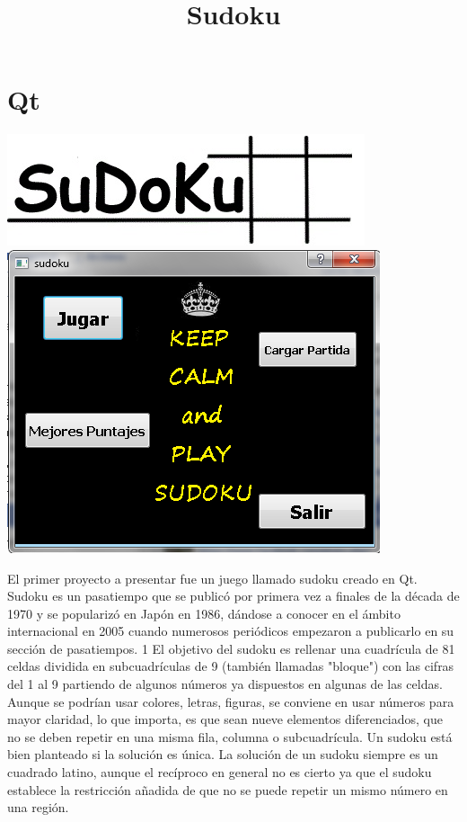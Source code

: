 \documentclass[12pt]{extbook}
\begin{document}
\chapter{Qt}
\begin{center}
\title{\Large{Sudoku}}\maketitle
\end{center}
\begin{center}
\includegraphics[width=.70\textwidth]{suini.jpg}
\includegraphics[width=.70\textwidth]{inicio.png}
\end{center}
El primer proyecto a presentar fue un juego llamado sudoku creado en Qt.
Sudoku es un pasatiempo que se publicó por primera vez a finales de la década de 1970 y se popularizó en Japón en 1986, dándose a conocer en el ámbito internacional en 2005 cuando numerosos periódicos empezaron a publicarlo en su sección de pasatiempos. 1 El objetivo del sudoku es rellenar una cuadrícula de 81 celdas  dividida en subcuadrículas de 9 (también llamadas "bloque") con las cifras del 1 al 9 partiendo de algunos números ya dispuestos en algunas de las celdas. Aunque se podrían usar colores, letras, figuras, se conviene en usar números para mayor claridad, lo que importa, es que sean nueve elementos diferenciados, que no se deben repetir en una misma fila, columna o subcuadrícula. Un sudoku está bien planteado si la solución es única. La solución de un sudoku siempre es un cuadrado latino, aunque el recíproco en general no es cierto ya que el sudoku establece la restricción añadida de que no se puede repetir un mismo número en una región.
\end{document}
